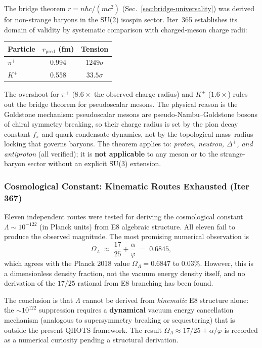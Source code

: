 \documentclass[aps,prd,twocolumn,superscriptaddress,floatfix,nofootinbib]{revtex4-2}
\theoremstyle{definition}
\theoremstyle{remark}
\newcommand{\vp}{\varphi}
\begin{document}
The bridge theorem $r = n\hbar c/(mc^2)$ (Sec.~\ref{sec:bridge-universality}) was derived for
non-strange baryons in the SU(2) isospin sector.  Iter~365 establishes its domain of
validity by systematic comparison with charged-meson charge radii:

\begin{center}
\begin{tabular}{lcc}
\hline
Particle & $r_{\text{pred}}$ (fm) & Tension \\
\hline
$\pi^+$ & 0.994 & $1249\sigma$ \\
$K^+$   & 0.558 & $33.5\sigma$ \\
\hline
\end{tabular}
\end{center}

The overshoot for $\pi^+$ ($8.6\times$ the observed charge radius) and $K^+$
($1.6\times$) rules out the bridge theorem for pseudoscalar mesons.  The physical
reason is the Goldstone mechanism: pseudoscalar mesons are pseudo-Nambu--Goldstone
bosons of chiral symmetry breaking, so their charge radius is set by the pion
decay constant $f_\pi$ and quark condensate dynamics, not by the topological
mass--radius locking that governs baryons.  The theorem applies to:
\textit{proton, neutron, $\Delta^+$, and antiproton} (all verified); it is
\textbf{not applicable} to any meson or to the strange-baryon sector without
an explicit SU(3) extension.

\subsubsection{Cosmological Constant: Kinematic Routes Exhausted (Iter 367)}
\label{sec:lambda-scope}

Eleven independent routes were tested for deriving the cosmological constant
$\Lambda \sim 10^{-122}$ (in Planck units) from E8 algebraic structure.
All eleven fail to produce the observed magnitude.  The most promising numerical
observation is
\begin{equation}
  \Omega_\Lambda \;\approx\; \frac{17}{25} + \frac{\alpha}{\vp} \;=\; 0.6845,
\end{equation}
which agrees with the Planck 2018 value $\Omega_\Lambda = 0.6847$ to $0.03\%$.
However, this is a dimensionless density fraction, not the vacuum energy density
itself, and no derivation of the $17/25$ rational from E8 branching has been
found.

The conclusion is that $\Lambda$ cannot be derived from \textit{kinematic} E8
structure alone: the $\sim\!10^{122}$ suppression requires a \textbf{dynamical}
vacuum energy cancellation mechanism (analogous to supersymmetry breaking or
sequestering) that is outside the present QHOTS framework.  The result $\Omega_\Lambda
\approx 17/25 + \alpha/\vp$ is recorded as a numerical curiosity pending a structural
derivation.
\end{document}
